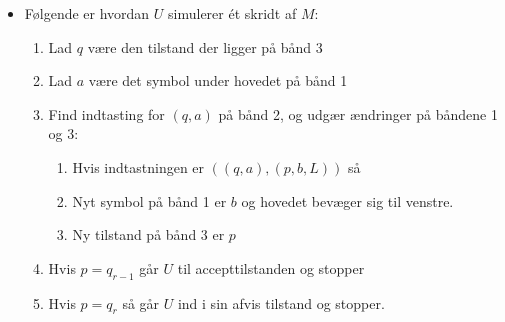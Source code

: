 \begin{frame}[allowframebreaks]
\begin{itemize}
          \item Følgende er hvordan $U$ simulerer ét skridt af $M$:
                \begin{enumerate}
                  \item Lad $q$ være den tilstand der ligger på bånd 3
                  \item Lad $a$ være det symbol under hovedet på bånd 1
                  \item Find indtasting for $(q,a)$ på bånd 2, og udgær ændringer på båndene 1 og 3:
                        \begin{enumerate}
                          \item Hvis indtastningen er $((q,a), (p,b,L))$ så
                          \item Nyt symbol på bånd 1 er $b$ og hovedet bevæger sig til venstre.
                          \item Ny tilstand på bånd 3 er $p$
                        \end{enumerate}
                  \item Hvis $p = q_{r-1}$ går $U$ til accepttilstanden og stopper
                  \item Hvis $p = q_{r}$ så går $U$ ind i sin afvis tilstand og stopper.

                \end{enumerate}

\end{itemize}
\end{frame}

